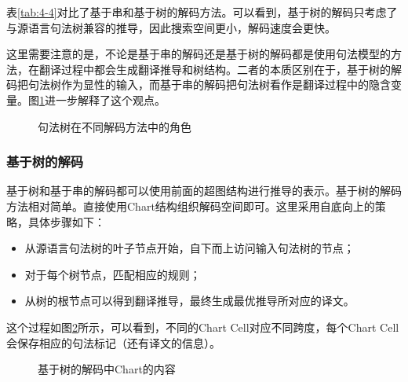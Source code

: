 \parinterval 表\ref{tab:4-4}对比了基于串和基于树的解码方法。可以看到，基于树的解码只考虑了与源语言句法树兼容的推导，因此搜索空间更小，解码速度会更快。

\parinterval 这里需要注意的是，不论是基于串的解码还是基于树的解码都是使用句法模型的方法，在翻译过程中都会生成翻译推导和树结构。二者的本质区别在于，基于树的解码把句法树作为显性的输入，而基于串的解码把句法树看作是翻译过程中的隐含变量。图\ref{fig:4-67}进一步解释了这个观点。

\begin{figure}[htp]
\centering

\caption{句法树在不同解码方法中的角色}
\label{fig:4-67}
\end{figure}


\subsubsection{基于树的解码}

\parinterval 基于树和基于串的解码都可以使用前面的超图结构进行推导的表示。基于树的解码方法相对简单。直接使用Chart结构组织解码空间即可。这里采用自底向上的策略，具体步骤如下：
\begin{itemize}
\vspace{0.5em}
\item 从源语言句法树的叶子节点开始，自下而上访问输入句法树的节点；
\vspace{0.5em}
\item 对于每个树节点，匹配相应的规则；
\vspace{0.5em}
\item 从树的根节点可以得到翻译推导，最终生成最优推导所对应的译文。
\vspace{0.5em}
\end{itemize}

\parinterval 这个过程如图\ref{fig:4-68}所示，可以看到，不同的Chart Cell对应不同跨度，每个Chart Cell会保存相应的句法标记（还有译文的信息）。

\begin{figure}[t]
\centering

\caption{基于树的解码中Chart的内容}
\label{fig:4-68}
\end{figure}

